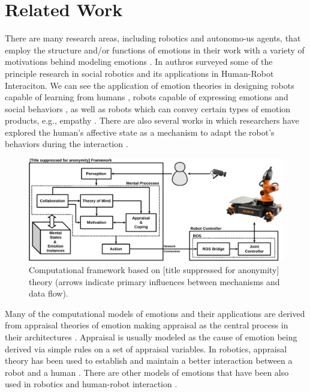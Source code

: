 \documentclass{sig-alternate-05-2015}
\begin{document}
\section{Related Work}

There are many research areas, including robotics and autonomo-us agents, that
employ the structure and/or functions of emotions in their work with a variety
of motivations behind modeling emotions
\cite{wehrle:motivations-modeling-emotion}. In
\cite{breazeal:sociable-interactive-robots} authros surveyed some of the
principle research in social robotics and its applications in Human-Robot
Interaciton. We can see the application of emotion theories in designing robots
capable of learning from humans \cite{breazeal:expressive-behavior}, robots
capable of expressing emotions \cite{cameron:expression-hri}
\cite{shayganfar:methodology} and social behaviors
\cite{paiva:emotion-modeling}, as well as robots which can convey certain types
of emotion products, e.g., empathy \cite{leite:empathy-hri}. There are also
several works in which researchers have explored the human's affective state as
a mechanism to adapt the robot's behaviors during the interaction
\cite{breazeal:sociable-robot} \cite{liu:affect-robot-behavior}.

\begin{figure}[tbh]
  \centering
  \includegraphics[width=\textwidth]{figure/framework-croped.pdf}
  \caption{{\fontsize{9}{9}\selectfont Computational framework based on
  [title suppressed for anonymity] theory (arrows indicate primary influences
  between mechanisms and data flow).}}
  \vspace*{-5mm}
  \label{fig:framework}
\end{figure}

Many of the computational models of emotions and their applications are derived
from appraisal theories of emotion making appraisal as the central process in
their architectures \cite{adam:bdi-emotional-companion}
\cite{marinier:behavior-emotion} \cite{marsella:ema-process-model}
\cite{si:modeling-appraisal-tom-journal}. Appraisal is usually modeled as the
cause of emotion being derived via simple rules on a set of appraisal variables.
In robotics, appraisal theory has been used to establish and maintain a better
interaction between a robot and a human \cite{castro:autonomous-robot-fear}
\cite{kim:model-hri-appraisal} \cite{pontier:women-robot-men}
\cite{vogiatzis:robot-museum}. There are other models of emotions that have been
also used in robotics and human-robot interaction \cite{klug:emotion-based-hri}
\cite{lim:mei-motherese-ei} \cite{zhang:service-robot-dimensional}.
\end{document}
